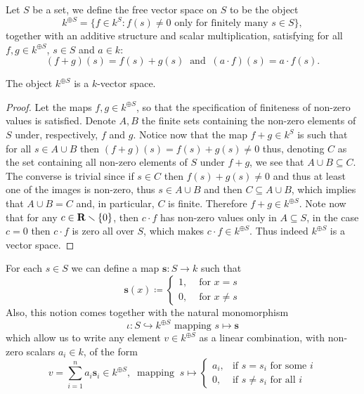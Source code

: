 \begin{definition}\label{def: free vector space}
    Let \(S\) be a set, we define the free vector space on \(S\) to be the object
    \[
        k^{\oplus S} = \{f \in k^S \colon f(s) \neq 0 \text{ only for finitely many }
        s \in S\},
    \]
    together with an additive structure and scalar multiplication, satisfying for
    all \(f, g \in k^{\oplus S}\), \(s \in S\) and \(a \in k\):
    \[
        (f + g)(s) = f(s) + g(s)\ \text{ and }\ (a \cdot f)(s) = a \cdot f(s).
    \]
\end{definition}

\begin{proposition}
    The object \(k^{\oplus S}\) is a \(k\)-vector space.
\end{proposition}

\begin{proof}
    Let the maps \(f, g \in k^{\oplus S}\), so that the specification of
    finiteness of non-zero values is satisfied. Denote \(A, B\) the finite sets
    containing the non-zero elements of \(S\) under, respectively, \(f\) and
    \(g\). Notice now that the map \(f + g \in k^S\) is such that for all \(s \in
    A \cup B\) then \((f+g)(s) = f(s)+g(s) \neq  0\) thus, denoting \(C\) as the
    set containing all non-zero elements of \(S\) under \(f + g\), we see that \(A
    \cup B \subseteq C\). The converse is trivial since if \(s \in C\) then
    \(f(s) + g(s) \neq 0\) and thus at least one of the images is non-zero, thus
    \(s \in A \cup B\) and then \(C \subseteq  A \cup B\), which implies that \(A
    \cup B = C\) and, in particular, \(C\) is finite. Therefore \(f + g \in
    k^{\oplus S}\). Note now that for any \(c \in \mathbf{R} \smallsetminus \{0\}\),
    then \(c \cdot f\) has non-zero values only in \(A \subseteq S\), in the case
    \(c = 0\) then  \(c \cdot f\) is zero all over \(S\), which makes \(c \cdot f
    \in k^{\oplus S}\). Thus indeed \(k^{\oplus S}\) is a vector space.
\end{proof}

For each \(s \in S\) we can define a map \(\mathbf{s} : S \to k\) such that
\[
    \mathbf{s}(x) \coloneq
    \begin{cases}
        1, & \text{ for } x = s    \\
        0, & \text{ for } x \neq s
    \end{cases}
\]
Also, this notion comes together with the natural monomorphism
\[
    \iota : S \hookrightarrow k^{\oplus S} \text{ mapping } s \mapsto \mathbf{s}
\]
which allow us to write any element \(v \in k^{\oplus S}\) as a linear
combination, with non-zero scalars \(a_i \in k\), of the form
\[
    v = \sum_{i=1}^n a_i \mathbf{s}_i \in k^{\oplus S},\
    \text{ mapping }\ s \mapsto
    \begin{cases}
        a_i, & \text{if } s = s_i \text{ for some } i   \\
        0,   & \text{if } s \neq s_i \text{ for all } i
    \end{cases}
\]

